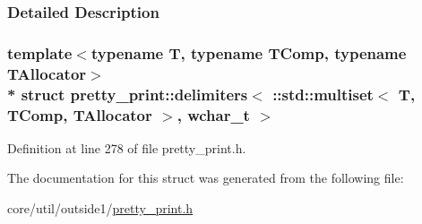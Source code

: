 \subsubsection{Detailed Description}
\subsubsection*{template$<$typename T, typename T\+Comp, typename T\+Allocator$>$\\*
struct pretty\+\_\+print\+::delimiters$<$ \+::std\+::multiset$<$ T, T\+Comp, T\+Allocator $>$, wchar\+\_\+t $>$}



Definition at line 278 of file pretty\+\_\+print.\+h.



The documentation for this struct was generated from the following file\+:\begin{DoxyCompactItemize}
\item 
core/util/outside1/\hyperlink{pretty__print_8h}{pretty\+\_\+print.\+h}\end{DoxyCompactItemize}

